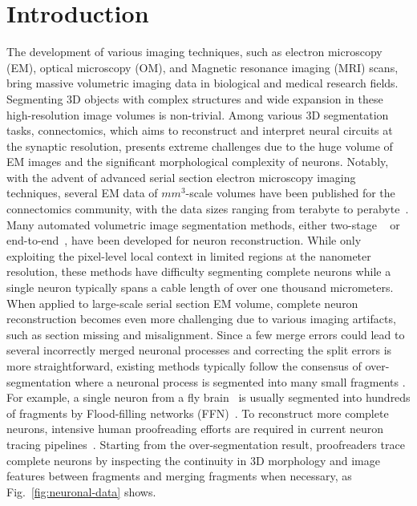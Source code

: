 
\section{Introduction}
\label{sec:introduction}

 
The development of various imaging techniques, such as electron microscopy (EM), optical microscopy (OM), and Magnetic resonance imaging (MRI) scans, bring massive volumetric imaging data in biological and medical research fields. 
Segmenting 3D objects with complex structures and wide expansion in these high-resolution image volumes is non-trivial. 
Among various 3D segmentation tasks, connectomics, which aims to reconstruct and interpret neural circuits at the synaptic resolution, presents extreme challenges due to the huge volume of EM images and the significant morphological complexity of neurons. 
Notably, with the advent of advanced serial section electron microscopy imaging techniques, several EM data of $mm^3$-scale volumes have been published for the connectomics community, with the data sizes ranging from terabyte to perabyte~\cite{FAFB, h01, microns2021functional}.
Many automated volumetric image segmentation methods, either two-stage ~\cite{lee2021learning,beier2017multicut,funke2018large,sheridan2022local, lee2017superhuman} or end-to-end~\cite{FFN}, have been developed for neuron reconstruction.
While only exploiting the pixel-level local context in limited regions at the nanometer resolution, these methods have difficulty segmenting complete neurons while a single neuron typically spans a cable length of over one thousand micrometers.
%
When applied to large-scale serial section EM volume, complete neuron reconstruction becomes even more challenging due to various imaging artifacts, such as section missing and misalignment. Since a few merge errors could lead to several incorrectly merged neuronal processes and correcting the split errors is more straightforward, existing methods typically follow the consensus of over-segmentation where a neuronal process is segmented into many small fragments \cite{fafb-ffn,matejek2019biologically,FFN}. For example, a single neuron from a fly brain~\cite{FAFB} is usually segmented into hundreds of fragments by Flood-filling
networks (FFN)~\cite{fafb-ffn}. 
To reconstruct more complete neurons, intensive human proofreading efforts are required in current neuron tracing pipelines~\cite{dorkenwald2022flywire, h01}. Starting from the over-segmentation result, proofreaders trace complete neurons by inspecting the continuity in 3D morphology and image features between fragments and merging fragments when necessary, as Fig.~\ref{fig:neuronal-data} shows.  

